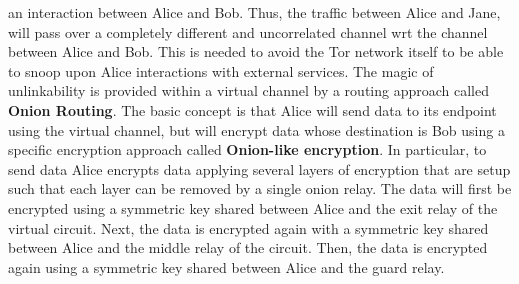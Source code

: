 an interaction between Alice and Bob. Thus, the traffic between Alice and Jane, will pass over a completely different and uncorrelated channel wrt the channel between Alice and Bob. This is needed to avoid the Tor network itself to be able to snoop upon Alice interactions with external services. The magic of unlinkability is provided within a virtual channel by a routing approach called \textbf{Onion Routing}. The basic concept is that Alice will send data to its endpoint using the virtual channel, but will encrypt data whose destination is Bob using a specific encryption approach called \textbf{Onion-like encryption}. In particular, to send data Alice encrypts data applying several layers of encryption that are setup such that each layer can be removed by a single onion relay. The data will first be encrypted using a symmetric key shared between Alice and the exit relay of the virtual circuit. Next, the data is encrypted again with a symmetric key shared between Alice and the middle relay of the circuit. Then, the data is encrypted again using a symmetric key shared between Alice and the guard relay. 

